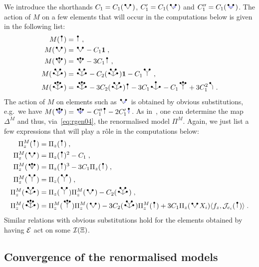 \documentclass[reqno,11pt]{article}
\def\unit{\vone}
\begin{document}
We introduce the shorthands $C_1=C_1(\RSV)$, $C_1'=C_1(\RSVo)$ and
$C_1''=C_1(\RSVoo)$. The action of $M$ on a few elements that will occur in the
computations below is given in the following list:
\begin{subequations}
\label{eq:M-AC} 
\begin{align}
\label{eq:M-AC-I}
M(\RSI) &= \RSI\;, \\
\label{eq:M-AC-V}
M(\RSV) &= \RSV - C_1\unit\;, \\
\label{eq:M-AC-W}
M(\RSW) &= \RSW - 3C_1\RSI\;, \\
M(\RSWV) &= \RSWV - C_2(\RSWV)\unit - C_1\RSY\;, %
\label{eq:M-AC-WV} \\
M(\RSWW) &= \RSWW - 3C_2(\RSWV)\RSI - 3C_1\RSWI - C_1\RSIW + 3C_1^2\RSII\;.
\label{eq:M-AC-WW}
\end{align}
\end{subequations}
The action of $M$ on elements such as $\RSVo$ is obtained by obvious
substitutions, e.g.\ we have $M(\RSWoo) = \RSWoo - C_1''\RSI - 2C_1'\RSoI$. As
in~\cite[Section~9.2]{Hairer2014}, one can determine the map
$\Delta^M$ and thus, via~\eqref{eq:rgen04}, the renormalised model $\Pi^M$.
Again, we just list a few expressions that will play a r\^ole in the
computations below:
\begin{subequations}
\label{eq:PiM-AC} 
\begin{align}
\label{eq:PiM-AC-I} 
\Pi^M_z(\RSI) &= \Pi_z(\RSI)\;, \\
\label{eq:PiM-AC-V} 
\Pi^M_z(\RSV) &= \Pi_z(\RSI)^2 - C_1\;, \\
\label{eq:PiM-AC-W} 
\Pi^M_z(\RSW) &= \Pi_z(\RSI)^3 - 3C_1\Pi_z(\RSI)\;, \\
\label{eq:PiM-AC-Y} 
\Pi^M_z(\RSY) &= \Pi_z(\RSY)\;, \\
\label{eq:PiM-AC-WV} 
\Pi^M_z(\RSWV) &= \Pi_z(\RSY)\Pi^M_z(\RSV) - C_2(\RSWV)\;, \\
\label{eq:PiM-AC-WW} 
\Pi^M_z(\RSWW) &= \Pi^M_z(\RSIW)\Pi^M_z(\RSV) - 3 C_2(\RSWV) \Pi^M_z(\RSI) + 
3C_1 \Pi_z(\RSV X_i) \pscal{f_z}{\cJ_{e_i}(\RSI)}\;.
\end{align}
\end{subequations}
Similar relations with obvious substitutions hold for the elements
obtained by having ${\mathcal E}$ act on some ${\mathcal I}(\Xi)$.


\subsection{Convergence of the renormalised models}
\label{ssec_renorm_FHN}
\end{document}
